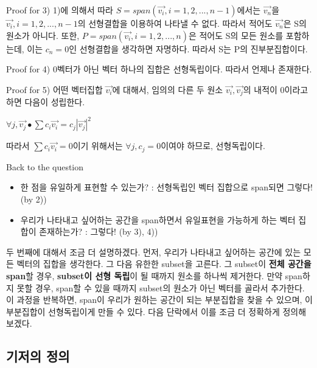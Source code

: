 \documentclass{beamer}
\begin{document}
\begin{frame}{Proof for 3)} 
1)에 의해서 따라 $S = span(\vec{v_i}, i = 1, 2, ... , n-1)$에서는 $\vec{v_n}$을 $\vec{v_i}, i = 1, 2, ... , n-1$의 선형결합을 이용하여 나타낼 수 없다. 따라서 적어도 $\vec{v_n}$은 S의 원소가 아니다. 또한, $P = span(\vec{v_i}, i = 1, 2, ... , n)$은 적어도 S의 모든 원소를 포함하는데, 이는 $c_n=0$인 선형결합을 생각하면 자명하다. 따라서 S는 P의 진부분집합이다. 
\end{frame}

\begin{frame}{Proof for 4)} 
0벡터가 아닌 벡터 하나의 집합은 선형독립이다. 따라서 언제나 존재한다. 
\end{frame}

\begin{frame}{Proof for 5)} 
어떤 벡터집합 $\vec{v_i}$에 대해서, 임의의 다른 두 원소 $\vec{v_i}, \vec{v_j}$의 내적이 0이라고 하면 다음이 성립한다. 

$\forall j, \vec{v_j} \bullet \sum c_i \vec{v_i} = c_j |\vec{v_j}|^2$ 

따라서 $\sum c_i \vec{v_i} = 0$이기 위해서는 $\forall j, c_j=0$이여야 하므로, 선형독립이다. 
\end{frame}

\begin{frame}{Back to the question}

\begin{itemize} 
\item 한 점을 유일하게 표현할 수 있는가? : 선형독립인 벡터 집합으로 span되면 그렇다! (by 2))
\item 우리가 나타내고 싶어하는 공간을 span하면서 유일표현을 가능하게 하는 벡터 집합이 존재하는가? : 그렇다! (by 3), 4))
\end{itemize}

두 번째에 대해서 조금 더 설명하겠다. 먼저, 우리가 나타내고 싶어하는 공간에 있는 모든 벡터의 집합을 생각한다. 그 다음 유한한 subset을 고른다. 그 subset이 \textbf{전체 공간을 span}할 경우, \textbf{subset이 선형 독립}이 될 때까지 원소를 하나씩 제거한다. 만약 span하지 못할 경우, span할 수 있을 때까지 subset의 원소가 아닌 벡터를 골라서 추가한다. 이 과정을 반복하면, span이 우리가 원하는 공간이 되는 부분집합을 찾을 수 있으며, 이 부분집합이 선형독립이게 만들 수 있다. 다음 단락에서 이를 조금 더 정확하게 정의해 보겠다. 
\end{frame}

\subsection{기저의 정의} 
\end{document}
